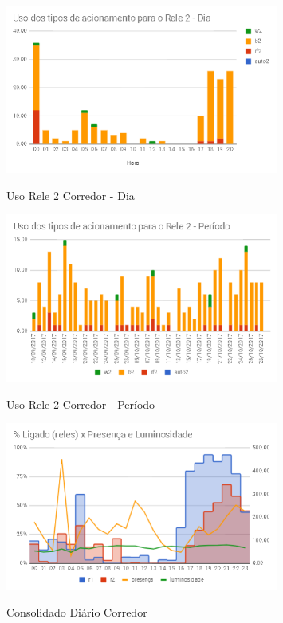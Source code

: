 \begin{figure}[H]
	\centering
	\caption{Uso Rele 2 Corredor - Dia}
	\includegraphics[width=0.8\textwidth]{usoRele2CorredorDia}
	\label{fig:usoRele2CorredorDia}
\end{figure}

\begin{figure}[H]
	\centering
	\caption{Uso Rele 2 Corredor - Período}
	\includegraphics[width=0.8\textwidth]{UsoRele2CorredorPeriodo}
	\label{fig:UsoRele2CorredorPeriodo}
\end{figure}

\begin{figure}[H]
	\centering
	\caption{Consolidado Diário Corredor}
	\includegraphics[width=0.8\textwidth]{RelesTempLuminosidadeCorredor}
	\label{fig:RelesTempLuminosidadeCorredor}
\end{figure}

